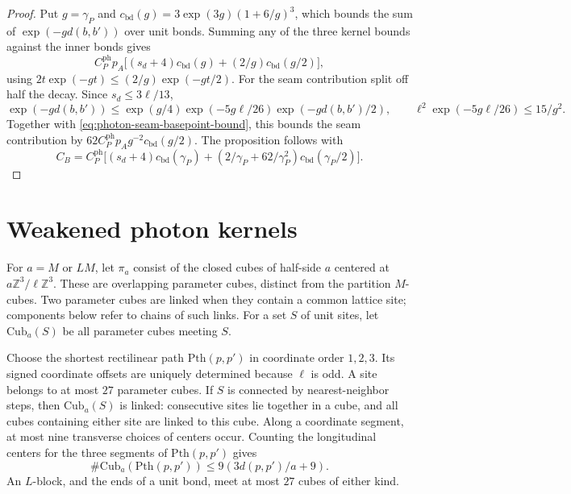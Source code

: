 \documentclass[11pt,letterpaper,reqno]{amsart}
\newcommand{\Z}{\mathbb Z}
\begin{document}
\begin{proof}
Put $g=\gamma_P$ and
$c_{\mathrm{bd}}(g)=3\exp(3g)(1+6/g)^3$, which bounds the sum
of $\exp(-g d(b,b'))$ over unit bonds. Summing any of the three
kernel bounds against the inner bonds gives
\[
 C_P^{\mathrm{ph}}p_A\big[(s_d+4)c_{\mathrm{bd}}(g)
                         +(2/g)c_{\mathrm{bd}}(g/2)\big],
\]
using $2t\exp(-gt)\le(2/g)\exp(-gt/2)$.
For the seam contribution split off half the decay. Since
$s_d\le3\ell/13$,
\[
 \exp(-g d(b,b'))
 \le\exp(g/4)\exp(-5g\ell/26)\exp(-g d(b,b')/2),
 \qquad
 \ell^2\exp(-5g\ell/26)\le15/g^2.
\]
Together with \eqref{eq:photon-seam-basepoint-bound}, this bounds
the seam contribution by
$62C_P^{\mathrm{ph}}p_Ag^{-2}c_{\mathrm{bd}}(g/2)$.
The proposition follows with
\begin{equation}\label{eq:photon-local-regularity-constant}
 C_B=C_P^{\mathrm{ph}}\big[(s_d+4)c_{\mathrm{bd}}(\gamma_P)
 +(2/\gamma_P+62/\gamma_P^2)c_{\mathrm{bd}}(\gamma_P/2)\big].
\end{equation}
\end{proof}

\section{Weakened photon kernels}
\label{subsec:photon-weakened-kernels}

For $a=M$ or $LM$, let $\pi_a$ consist of the closed cubes of
half-side $a$ centered at $a\Z^3/\ell\Z^3$. These are overlapping
parameter cubes, distinct from the partition $M$-cubes.
Two parameter cubes are linked when they contain a common lattice
site; components below refer to chains of such links. For a set
$S$ of unit sites, let $\mathrm{Cub}_a(S)$ be all parameter cubes
meeting $S$.

Choose the shortest rectilinear path $\mathrm{Pth}(p,p')$ in
coordinate order $1,2,3$. Its signed coordinate offsets are
uniquely determined because $\ell$ is odd. A site belongs to at
most $27$ parameter cubes. If $S$ is connected by nearest-neighbor
steps, then $\mathrm{Cub}_a(S)$ is linked: consecutive sites lie
together in a cube, and all cubes containing either site are
linked to this cube. Along a coordinate segment, at most nine
transverse choices of centers occur. Counting the longitudinal
centers for the three segments of $\mathrm{Pth}(p,p')$ gives
\begin{equation}\label{eq:photon-parameter-path-count}
 \#\mathrm{Cub}_a(\mathrm{Pth}(p,p'))
                            \le9(3d(p,p')/a+9).
\end{equation}
An $L$-block, and the ends of a unit bond, meet at most $27$
cubes of either kind.
\end{document}
